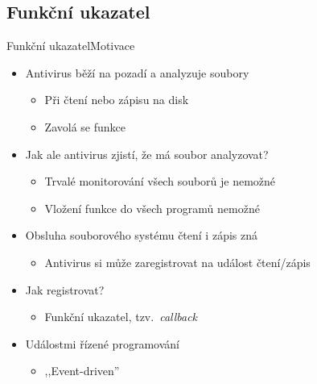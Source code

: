 \subsection*{Funkční ukazatel}
\frame{\subsectionpage}

\begin{frame}{Funkční ukazatel}{Motivace}

  \begin{itemize}
    \item Antivirus běží na pozadí a analyzuje soubory
    \begin{itemize}
      \item Při čtení nebo zápisu na disk
      \item Zavolá se funkce 
    \end{itemize}

    \pause

    \item Jak ale antivirus zjistí, že má soubor analyzovat?
    \begin{itemize}
      \item Trvalé monitorování všech souborů je nemožné
      \item Vložení funkce  do všech programů nemožné
    \end{itemize}

    \pause

    \item Obsluha souborového systému čtení i zápis zná
    \begin{itemize}
      \item Antivirus si může zaregistrovat  na událost
	čtení/zápis
    \end{itemize}

    \pause

    \item Jak registrovat?
    \begin{itemize}
      \item Funkční ukazatel, tzv.\ \textit{callback}
    \end{itemize}

    \pause

    \item Událostmi řízené programování
    \begin{itemize}
      \item ,,Event-driven''
    \end{itemize}
  \end{itemize}

\end{frame}


